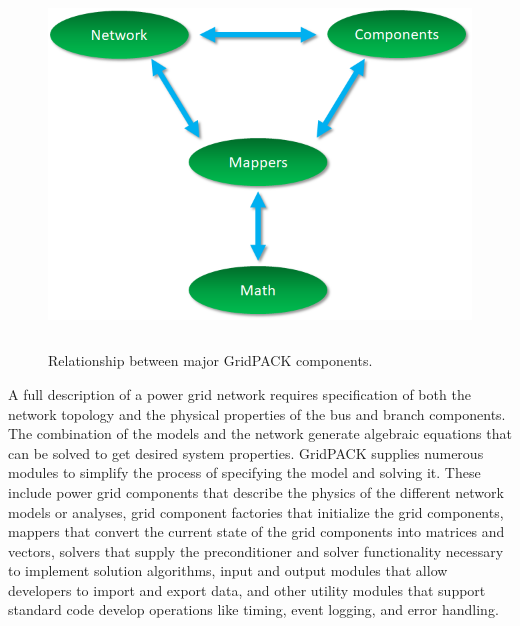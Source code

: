 \documentclass[12pt]{report} %
\begin{document}
\begin{figure}
  \centering
    \includegraphics*[width=6in, height=3.81in, keepaspectratio=true]{Fig1-Relationship-Grid-components}
  \caption{Relationship between major GridPACK components.}
  \label{fig:fig-1}
\end{figure}




A full description of a power grid network requires specification of both the network topology and the physical properties of the bus and branch components. The combination of the models and the network generate algebraic equations that can be solved to get desired system properties. GridPACK supplies numerous modules to simplify the process of specifying the model and solving it. These include power grid components that describe the physics of the different network models or analyses, grid component factories that initialize the grid components, mappers that convert the current state of the grid components into matrices and vectors, solvers that supply the preconditioner and solver functionality necessary to implement solution algorithms, input and output modules that allow developers to import and export data, and other utility modules that support standard code develop operations like timing, event logging, and error handling.
\end{document}
